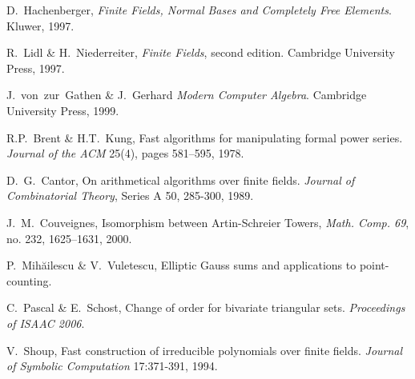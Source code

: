 \begin{thebibliography}{1}

D.~Hachenberger, \emph{Finite Fields, Normal Bases and
  Completely Free Elements}. Kluwer, 1997.

R.~Lidl \& H.~Niederreiter, \emph{Finite Fields}, second
  edition. Cambridge University Press, 1997.

J.~von~zur~Gathen \& J.~Gerhard
  \emph{Modern Computer Algebra}.
  Cambridge University Press, 1999.

R.P.~Brent \& H.T.~Kung, Fast algorithms for manipulating
  formal power series.  \emph{Journal of the ACM} 25(4), pages
  581--595, 1978.

D.~G.~Cantor, On arithmetical algorithms over finite
  fields. \emph{Journal of Combinatorial Theory}, Series A 50,
  285-300, 1989.

J.~M.~Couveignes, Isomorphism between Artin-Schreier
  Towers, \emph{Math. Comp. 69}, no. 232, 1625--1631, 2000.

P.~Mih\u ailescu \& V.~Vuletescu, Elliptic Gauss sums and
  applications to point-counting.

C.~Pascal \& E.~Schost, Change of order for bivariate
  triangular sets. \emph{Proceedings of ISAAC 2006}. 

V.~Shoup, Fast construction of irreducible polynomials
  over finite fields. \emph{Journal of Symbolic Computation} 17:371-391,
  1994.

\end{thebibliography}
